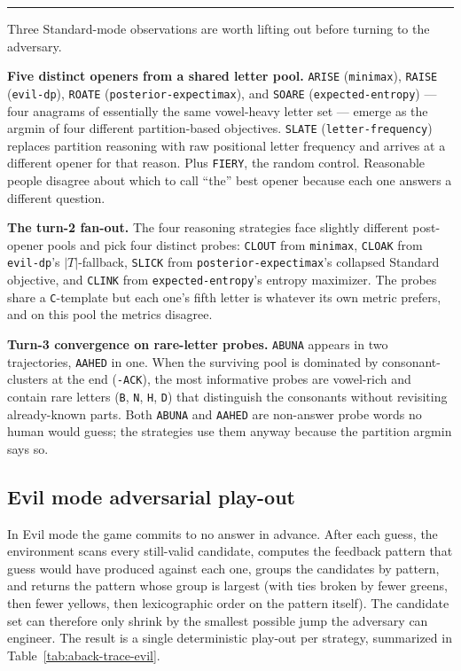 \documentclass[11pt]{article}
\begin{document}
\bigskip
\noindent\textcolor{black!18}{\rule{\linewidth}{0.6pt}}\par
\medskip

Three Standard-mode observations are worth lifting out before turning
to the adversary.

\textbf{Five distinct openers from a shared letter pool.}
\texttt{ARISE} (\texttt{minimax}), \texttt{RAISE} (\texttt{evil-dp}),
\texttt{ROATE} (\texttt{posterior-expectimax}), and \texttt{SOARE}
(\texttt{expected-entropy}) --- four anagrams of essentially the
same vowel-heavy letter set --- emerge as the argmin of four
different partition-based objectives. \texttt{SLATE}
(\texttt{letter-frequency}) replaces partition reasoning with raw
positional letter frequency and arrives at a different opener for
that reason. Plus \texttt{FIERY}, the random control. Reasonable
people disagree about which to call ``the'' best opener because
each one answers a different question.

\textbf{The turn-2 fan-out.} The four reasoning strategies face
slightly different post-opener pools and pick four distinct probes:
\texttt{CLOUT} from \texttt{minimax}, \texttt{CLOAK} from
\texttt{evil-dp}'s $|T|$-fallback, \texttt{SLICK} from
\texttt{posterior-expectimax}'s collapsed Standard objective, and
\texttt{CLINK} from \texttt{expected-entropy}'s entropy maximizer.
The probes share a \texttt{C}-template but each one's fifth letter
is whatever its own metric prefers, and on this pool the metrics
disagree.

\textbf{Turn-3 convergence on rare-letter probes.} \texttt{ABUNA}
appears in two trajectories, \texttt{AAHED} in one. When the
surviving pool is dominated by consonant-clusters at the end
(\texttt{-ACK}), the most informative probes are vowel-rich and
contain rare letters (\texttt{B}, \texttt{N}, \texttt{H}, \texttt{D})
that distinguish the consonants without revisiting already-known
parts. Both \texttt{ABUNA} and \texttt{AAHED} are non-answer probe
words no human would guess; the strategies use them anyway because
the partition argmin says so.

\subsection*{Evil mode \textbullet{} adversarial play-out}

In Evil mode the game commits to no answer in advance. After each
guess, the environment scans every still-valid candidate, computes the
feedback pattern that guess would have produced against each one,
groups the candidates by pattern, and returns the pattern whose group
is largest (with ties broken by fewer greens, then fewer yellows,
then lexicographic order on the pattern itself). The candidate set
can therefore only shrink by the smallest possible jump the adversary
can engineer. The result is a single deterministic play-out per
strategy, summarized in Table~\ref{tab:aback-trace-evil}.
\end{document}
